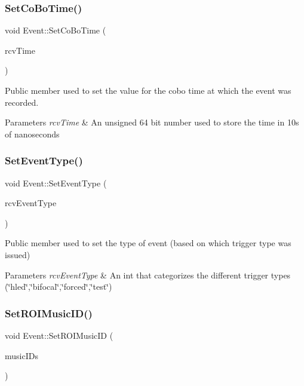 \subsubsection{\texorpdfstring{Set\+Co\+Bo\+Time()}{SetCoBoTime()}}
{\footnotesize\ttfamily void Event\+::\+Set\+Co\+Bo\+Time (\begin{DoxyParamCaption}\item[{U\+Long64\+\_\+t}]{rcv\+Time }\end{DoxyParamCaption})}



Public member used to set the value for the cobo time at which the event was recorded. 


\begin{DoxyParams}{Parameters}
{\em rcv\+Time} & An unsigned 64 bit number used to store the time in 10s of nanoseconds \\
\hline
\end{DoxyParams}
\mbox{\label{classEvent_ab084c2b49b15b135cd7a43f1919e4fb9}} 
\subsubsection{\texorpdfstring{Set\+Event\+Type()}{SetEventType()}}
{\footnotesize\ttfamily void Event\+::\+Set\+Event\+Type (\begin{DoxyParamCaption}\item[{Int\+\_\+t}]{rcv\+Event\+Type }\end{DoxyParamCaption})}



Public member used to set the type of event (based on which trigger type was issued) 


\begin{DoxyParams}{Parameters}
{\em rcv\+Event\+Type} & An int that categorizes the different trigger types (\char`\"{}hled\char`\"{},\char`\"{}bifocal\char`\"{},\char`\"{}forced\char`\"{},\char`\"{}test\char`\"{}) \\
\hline
\end{DoxyParams}
\mbox{\label{classEvent_aba7eeb4eb55183924e5a89e2256b9f5a}} 
\subsubsection{\texorpdfstring{Set\+R\+O\+I\+Music\+I\+D()}{SetROIMusicID()}}
{\footnotesize\ttfamily void Event\+::\+Set\+R\+O\+I\+Music\+ID (\begin{DoxyParamCaption}\item[{vector$<$ Int\+\_\+t $>$}]{music\+I\+Ds }\end{DoxyParamCaption})}



